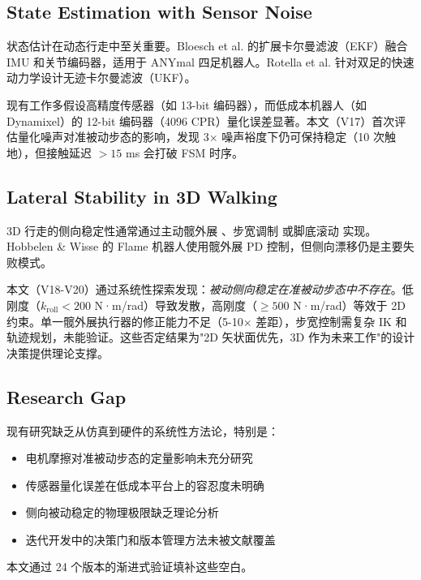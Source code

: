 \subsection{State Estimation with Sensor Noise}

状态估计在动态行走中至关重要。Bloesch et al. \cite{Bloesch2013} 的扩展卡尔曼滤波（EKF）融合 IMU 和关节编码器，适用于 ANYmal 四足机器人。Rotella et al. \cite{Rotella2014} 针对双足的快速动力学设计无迹卡尔曼滤波（UKF）。

现有工作多假设高精度传感器（如 13-bit 编码器），而低成本机器人（如 Dynamixel）的 12-bit 编码器（4096 CPR）量化误差显著。本文（V17）首次评估量化噪声对准被动步态的影响，发现 3× 噪声裕度下仍可保持稳定（10 次触地），但接触延迟 $>15$ ms 会打破 FSM 时序。

\subsection{Lateral Stability in 3D Walking}

3D 行走的侧向稳定性通常通过主动髋外展 \cite{Hobbelen2008}、步宽调制 \cite{Rebula2007} 或脚底滚动 \cite{Wisse2007} 实现。Hobbelen \& Wisse \cite{Hobbelen2008} 的 Flame 机器人使用髋外展 PD 控制，但侧向漂移仍是主要失败模式。

本文（V18-V20）通过系统性探索发现：\textit{被动侧向稳定在准被动步态中不存在}。低刚度（$k_{\text{roll}} < 200$ N·m/rad）导致发散，高刚度（$\geq 500$ N·m/rad）等效于 2D 约束。单一髋外展执行器的修正能力不足（5-10× 差距），步宽控制需复杂 IK 和轨迹规划，未能验证。这些否定结果为"2D 矢状面优先，3D 作为未来工作"的设计决策提供理论支撑。

\subsection{Research Gap}

现有研究缺乏从仿真到硬件的系统性方法论，特别是：
\begin{itemize}
    \item 电机摩擦对准被动步态的定量影响未充分研究
    \item 传感器量化误差在低成本平台上的容忍度未明确
    \item 侧向被动稳定的物理极限缺乏理论分析
    \item 迭代开发中的决策门和版本管理方法未被文献覆盖
\end{itemize}

本文通过 24 个版本的渐进式验证填补这些空白。
